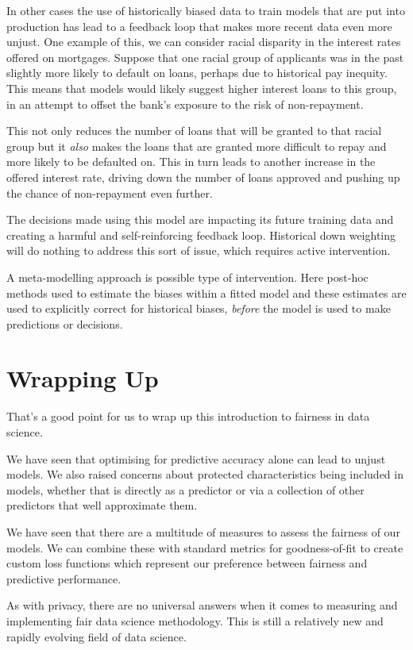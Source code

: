 \documentclass[
  letterpaper,
  DIV=11,
  numbers=noendperiod]{scrreprt}
\begin{document}
In other cases the use of historically biased data to train models that
are put into production has lead to a feedback loop that makes more
recent data even more unjust. One example of this, we can consider
racial disparity in the interest rates offered on mortgages. Suppose
that one racial group of applicants was in the past slightly more likely
to default on loans, perhaps due to historical pay inequity. This means
that models would likely suggest higher interest loans to this group, in
an attempt to offset the bank's exposure to the risk of non-repayment.

This not only reduces the number of loans that will be granted to that
racial group but it \emph{also} makes the loans that are granted more
difficult to repay and more likely to be defaulted on. This in turn
leads to another increase in the offered interest rate, driving down the
number of loans approved and pushing up the chance of non-repayment even
further.

The decisions made using this model are impacting its future training
data and creating a harmful and self-reinforcing feedback loop.
Historical down weighting will do nothing to address this sort of issue,
which requires active intervention.

A meta-modelling approach is possible type of intervention. Here
post-hoc methods used to estimate the biases within a fitted model and
these estimates are used to explicitly correct for historical biases,
\emph{before} the model is used to make predictions or decisions.

\section{Wrapping Up}\label{wrapping-up-9}

That's a good point for us to wrap up this introduction to fairness in
data science.

We have seen that optimising for predictive accuracy alone can lead to
unjust models. We also raised concerns about protected characteristics
being included in models, whether that is directly as a predictor or via
a collection of other predictors that well approximate them.

We have seen that there are a multitude of measures to assess the
fairness of our models. We can combine these with standard metrics for
goodness-of-fit to create custom loss functions which represent our
preference between fairness and predictive performance.

As with privacy, there are no universal answers when it comes to
measuring and implementing fair data science methodology. This is still
a relatively new and rapidly evolving field of data science.
\end{document}
